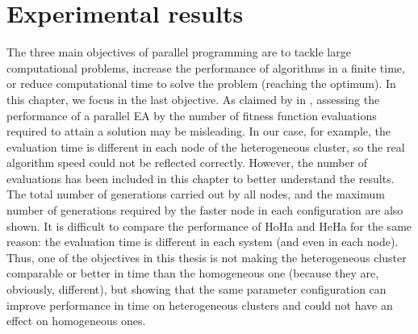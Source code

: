 
\section{Experimental results}
The three main objectives of parallel programming are to tackle large computational problems, increase the performance of algorithms in a finite time, or reduce computational time to solve the problem (reaching the optimum). In this chapter, we focus in the last objective.
As claimed by  in \cite{Alba06evaluationParallel}, assessing the performance of a parallel EA by the number of fitness function evaluations required to attain a solution may be misleading. In our case, for example, the evaluation time is different in each node of the heterogeneous cluster, so the real algorithm speed could not be reflected correctly. However, the number of evaluations has been included in this chapter to better understand the results. The total number of generations carried out by all nodes, and the maximum number of generations required by the faster node in each configuration are also shown. It is difficult to compare the performance of HoHa and HeHa for the same reason: the evaluation time is different in each system (and even in each node). Thus, one of the objectives in this thesis is not making the heterogeneous cluster comparable or better in time than the homogeneous one (because they are, obviously, different), but showing that the same parameter configuration can improve performance in time on heterogeneous clusters and could not have an effect on homogeneous ones.


